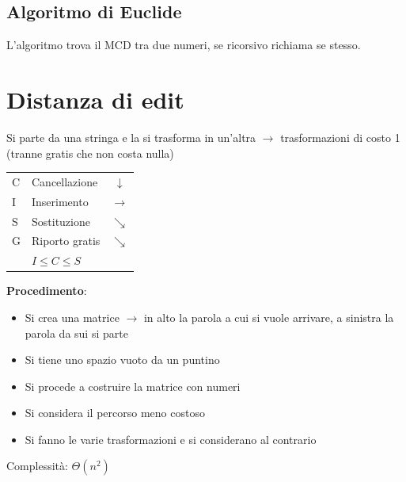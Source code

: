 \documentclass[12pt,a4paper]{article}
\begin{document}
\subsection{Algoritmo di Euclide}
L'algoritmo trova il MCD tra due numeri, se ricorsivo richiama se stesso.

\clearpage
\section{Distanza di edit}
Si parte da una stringa e la si trasforma in un'altra $\rightarrow$ trasformazioni di costo 1 (tranne gratis che non costa nulla)
\begin{center}
\begin{tabular}{llc}
C & Cancellazione & $\downarrow$\\
I & Inserimento & $\rightarrow$\\
S & Sostituzione & $\searrow$\\
G & Riporto gratis & $\searrow$\\
& $ I \leq C \leq S$ & 
\end{tabular}
\end{center}
\textbf{Procedimento}:
\begin{itemize}
\item Si crea una matrice $\rightarrow$ in alto la parola a cui si vuole arrivare, a sinistra la parola da sui si parte
\item Si tiene uno spazio vuoto da un puntino
\item Si procede a costruire la matrice con numeri
\item Si considera il percorso meno costoso
\item Si fanno le varie trasformazioni e si considerano al contrario
\end{itemize}
Complessità: $\Theta(n^2)$

\clearpage
\end{document}
